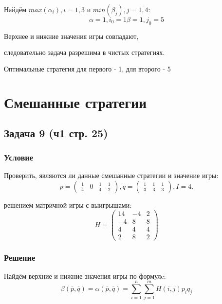 \documentclass[a4paper,14pt]{extreport}
\begin{document}
Найдём $max(\alpha_i), i=\overline{1, 3}$ и $min(\beta_j), j=\overline{1, 4} $:
\begin{equation}
    \alpha = 1, i_0 = 1
    \beta = 1, j_0 = 5
\end{equation}

Верхнее и нижние значения игры совпадают, \par
следовательно задача разрешима в чистых стратегиях. \par
Оптимальные стратегия для первого - 1, для второго - 5

\chapter{Смешанные стратегии}
\section{Задача 9 (ч1 стр. 25)}
\subsection{Условие}
Проверить, являются ли данные смешанные стратегии и значение игры:
\begin{equation*}
    p = \begin{pmatrix}\frac{1}{4} & 0 & \frac{1}{4} & \frac{1}{2} \end{pmatrix}, 
    q = \begin{pmatrix}\frac{1}{3} & \frac{1}{3} & \frac{1}{3} \end{pmatrix},
    I = 4.
\end{equation*} \par
решением матричной игры с выигрышами:
\begin{equation*}
    H = \begin{pmatrix} 
            14 & -4 & 2 \\
            -4 & 8 & 8 \\
            4 & 4 & 4 \\
            2& 8 & 2
        \end{pmatrix}
\end{equation*}

\subsection{Решение}
Найдём верхние и нижние значения игры по формулe:
\begin{equation}
    \beta(\overline{p}, \overline{q}) = \alpha(\overline{p}, \overline{q}) = \sum_{i=1}^n\sum_{j=1}^mH(i,j) p_i q_j
\end{equation}
\end{document}
